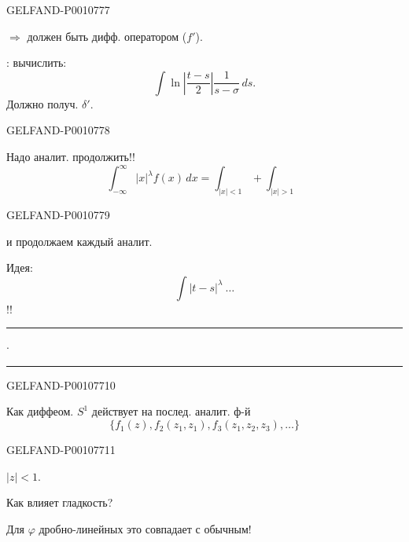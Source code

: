 \begin{GelfandAdjacentEvidence}{GELFAND-P001077}{7}



$\Rightarrow$ должен быть дифф. оператором ($f'$).

: вычислить:
\begin{equation*}
\int\ln\left|\frac{t-s}{2}\right|\frac{1}{s-\sigma}\,ds.
\end{equation*}
Должно получ. $\delta'$.
\end{GelfandAdjacentEvidence}
\begin{GelfandAdjacentEvidence}{GELFAND-P001077}{8}


Надо аналит. продолжить!!
\begin{equation*}
\int_{-\infty}^{\infty}|x|^\lambda f(x)\,dx
=\int_{|x|<1}+\int_{|x|>1}
\end{equation*}
\end{GelfandAdjacentEvidence}
\begin{GelfandAdjacentEvidence}{GELFAND-P001077}{9}

и продолжаем каждый аналит.

Идея:
\begin{equation*}
\int|t-s|^\lambda\ \ldots
\end{equation*}
!!

\begin{center}\rule{1.55em}{.45pt}\enspace\(\cdot\)\enspace\rule{1.55em}{.45pt}\end{center}
\end{GelfandAdjacentEvidence}
\begin{GelfandAdjacentEvidence}{GELFAND-P001077}{10}


Как диффеом. $S^1$ действует на послед. аналит. ф-й
\begin{equation*}
\{f_1(z),f_2(z_1,z_1),f_3(z_1,z_2,z_3),\ldots\}
\end{equation*}
\end{GelfandAdjacentEvidence}
\begin{GelfandAdjacentEvidence}{GELFAND-P001077}{11}

$|z|<1$.

Как влияет гладкость?

Для $\varphi$ дробно-линейных это совпадает с обычным!
\end{GelfandAdjacentEvidence}


